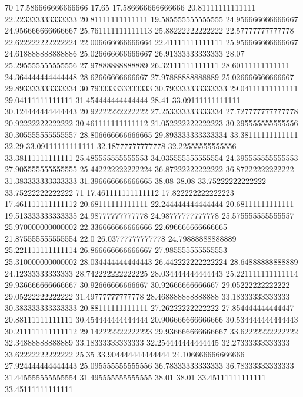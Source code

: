 70 17.586666666666666 17.65 17.586666666666666 20.81111111111111 22.223333333333333 20.81111111111111 19.585555555555555 24.956666666666667 24.956666666666667 25.761111111111113 25.88222222222222 22.57777777777778 22.622222222222224 22.006666666666664 22.41111111111111 25.956666666666667 24.618888888888886 25.026666666666667 26.91333333333333 28.07 25.295555555555556 27.97888888888889 26.32111111111111 28.60111111111111 24.364444444444448 28.62666666666667 27.97888888888889 25.026666666666667 29.893333333333334 30.793333333333333 30.793333333333333 29.04111111111111 29.04111111111111 31.454444444444444 28.41 33.09111111111111 30.124444444444443 20.92222222222222 27.253333333333334 27.727777777777778 20.92222222222222 30.461111111111112 21.052222222222223 30.295555555555556 30.305555555555557 28.806666666666665 29.893333333333334 33.38111111111111 32.29 33.09111111111111 32.18777777777778 32.22555555555556 33.38111111111111 25.485555555555553 34.035555555555554 24.395555555555553 27.905555555555555 25.442222222222224 36.87222222222222 36.87222222222222 31.383333333333333 31.396666666666665 38.08 38.08 33.75222222222222 33.75222222222222
71 17.461111111111112 17.822222222222223 17.461111111111112 20.68111111111111 22.244444444444444 20.68111111111111 19.513333333333335 24.98777777777778 24.98777777777778 25.575555555555557 25.970000000000002 22.336666666666666 22.696666666666665 21.875555555555554 22.0 26.03777777777778 24.79888888888889 25.221111111111114 26.866666666666667 27.985555555555553 25.310000000000002 28.034444444444443 26.442222222222224 28.64888888888889 24.12333333333333 28.742222222222225 28.034444444444443 25.221111111111114 29.936666666666667 30.92666666666667 30.92666666666667 29.05222222222222 29.05222222222222 31.49777777777778 28.468888888888888 33.18333333333333 30.383333333333333 20.88111111111111 27.26222222222222 27.854444444444447 20.88111111111111 30.454444444444444 20.906666666666666 30.534444444444443 30.211111111111112 29.142222222222223 29.936666666666667 33.62222222222222 32.34888888888889 33.18333333333333 32.254444444444445 32.27333333333333 33.62222222222222 25.35 33.904444444444444 24.106666666666666 27.924444444444443 25.095555555555556 36.78333333333333 36.78333333333333 31.445555555555554 31.495555555555555 38.01 38.01 33.45111111111111 33.45111111111111
